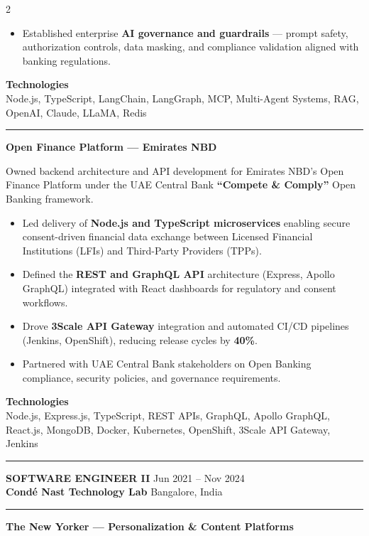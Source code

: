 \documentclass[10pt,a4paper]{article}
\newcommand{\blockdivider}{\vspace{0pt}\color{rulecolor}\rule{\linewidth}{0.5pt}\color{primary}\vspace{4pt}}
\newcommand{\roleheader}[4]{%
  \noindent
  \textbf{\MakeUppercase{#3}}%
  \hfill
  \textcolor{secondary}{#4}\\[0pt]

  \noindent
  \textbf{#1}%
  \hfill
  \textcolor{secondary}{#2}\\[0pt]
}
\newcommand{\roledivider}{%
  \vspace{-1pt}%
  {\color{rulecolor}\rule{\linewidth}{0.5pt}}%
  \vspace{2pt}%
}
\newcommand{\projecttitle}[1]{\textbf{#1}\par\vspace{2pt}}
\begin{document}
\begin{paracol}{2}
\begin{itemize}
\item Established enterprise \textbf{AI governance and guardrails} — prompt safety, authorization controls, data masking, and compliance validation aligned with banking regulations.

\end{itemize}

\textbf{Technologies}\\
Node.js, TypeScript, LangChain, LangGraph, MCP, Multi-Agent Systems, RAG, OpenAI, Claude, LLaMA, Redis

\blockdivider

\projecttitle{Open Finance Platform — Emirates NBD}

Owned backend architecture and API development for Emirates NBD's Open Finance Platform under the UAE Central Bank \textbf{``Compete \& Comply''} Open Banking framework.

\begin{itemize}

\item Led delivery of \textbf{Node.js and TypeScript microservices} enabling secure consent-driven financial data exchange between Licensed Financial Institutions (LFIs) and Third-Party Providers (TPPs).

\item Defined the \textbf{REST and GraphQL API} architecture (Express, Apollo GraphQL) integrated with React dashboards for regulatory and consent workflows.

\item Drove \textbf{3Scale API Gateway} integration and automated CI/CD pipelines (Jenkins, OpenShift), reducing release cycles by \textbf{40\%}.

\item Partnered with UAE Central Bank stakeholders on Open Banking compliance, security policies, and governance requirements.

\end{itemize}

\textbf{Technologies}\\
Node.js, Express.js, TypeScript, REST APIs, GraphQL, Apollo GraphQL, React.js, MongoDB, Docker, Kubernetes, OpenShift, 3Scale API Gateway, Jenkins

\blockdivider


\roleheader{Cond\'e Nast Technology Lab}{Bangalore, India}{Software Engineer II}{Jun 2021 -- Nov 2024}
\roledivider
\projecttitle{ The New Yorker — Personalization \& Content Platforms}


\end{paracol}
\end{document}
